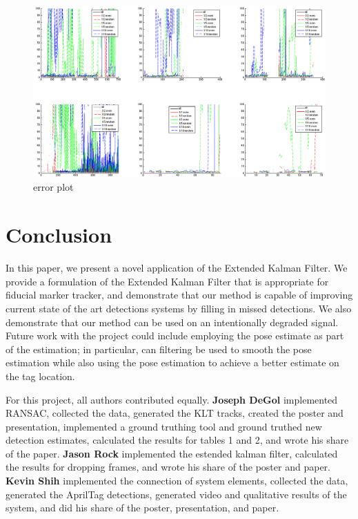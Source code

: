 \documentclass[letterpaper,10pt,conference]{IEEEtran}
\begin{document}
\begin{figure}
\includegraphics[scale=.3]{Corner_error}
\caption{error plot}
\label{fig:error_plot}
\end{figure}



\section{Conclusion}
\label{sec:conclusion}
In this paper, we present a novel application of the Extended Kalman Filter. We provide a formulation of the Extended Kalman Filter that is appropriate for fiducial marker tracker, and demonstrate that our method is capable of improving current state of the art detections systems by filling in missed detections. We also demonstrate that our method can be used on an intentionally degraded signal. Future work with the project could include employing the pose estimate as part of the estimation; in particular, can filtering be used to smooth the pose estimation while also using the pose estimation to achieve a better estimate on the tag location.

For this project, all authors contributed equally.
\textbf{Joseph DeGol} implemented RANSAC, collected the data, generated the KLT tracks, created the poster and presentation, implemented a ground truthing tool and ground truthed new detection estimates, calculated the results for tables 1 and 2, and wrote his share of the paper. \textbf{Jason Rock} implemented the estended kalman filter, calculated the results for dropping frames, and wrote his share of the poster and paper. \textbf{Kevin Shih} implemented the connection of system elements, collected the data, generated the AprilTag detections, generated video and qualitative results of the system, and did his share of the poster, presentation, and paper.





\end{document}
